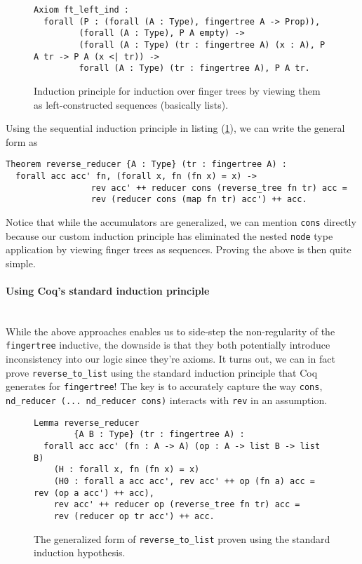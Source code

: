 \documentclass{article}
\newcommand{\code}[1]{\texttt{#1}}
\begin{document}
\begin{figure}[H]
\begin{verbatim}
Axiom ft_left_ind :
  forall (P : (forall (A : Type), fingertree A -> Prop)),
         (forall (A : Type), P A empty) ->
         (forall (A : Type) (tr : fingertree A) (x : A), P A tr -> P A (x <| tr)) ->
         forall (A : Type) (tr : fingertree A), P A tr.
\end{verbatim}
\caption{Induction principle for induction over finger trees by viewing
        them as left-constructed sequences (basically lists).}
\label{ft_left_ind}
\end{figure}

Using the sequential induction principle in listing (\ref{ft_left_ind}), we
can write the general form as

\begin{verbatim}
Theorem reverse_reducer {A : Type} (tr : fingertree A) :
  forall acc acc' fn, (forall x, fn (fn x) = x) ->
                 rev acc' ++ reducer cons (reverse_tree fn tr) acc =
                 rev (reducer cons (map fn tr) acc') ++ acc.
\end{verbatim}

Notice that while the accumulators are generalized, we can mention \code{cons}
directly because our custom induction principle has eliminated the nested
\code{node} type application by viewing finger trees as sequences. Proving
the above is then quite simple.

\paragraph{Using Coq's standard induction principle}\mbox{}\\
While the above approaches enables us to side-step the non-regularity of
the \code{fingertree} inductive, the downside is that they both potentially
introduce inconsistency into our logic since they're axioms. It turns out,
we can in fact prove \code{reverse\_to\_list} using the standard induction
principle that Coq generates for \code{fingertree}! The key is to accurately
capture the way \code{cons}, \code{nd\_reducer (... nd\_reducer cons)}
interacts with \code{rev} in an assumption.

\begin{figure}[H]
\begin{verbatim}
Lemma reverse_reducer
        {A B : Type} (tr : fingertree A) :
  forall acc acc' (fn : A -> A) (op : A -> list B -> list B)
    (H : forall x, fn (fn x) = x)
    (H0 : forall a acc acc', rev acc' ++ op (fn a) acc = rev (op a acc') ++ acc),
    rev acc' ++ reducer op (reverse_tree fn tr) acc =
    rev (reducer op tr acc') ++ acc.
\end{verbatim}
\caption{The generalized form of \code{reverse\_to\_list} proven using the standard
        induction hypothesis.}
\label{std_induct}
\end{figure}
\end{document}
